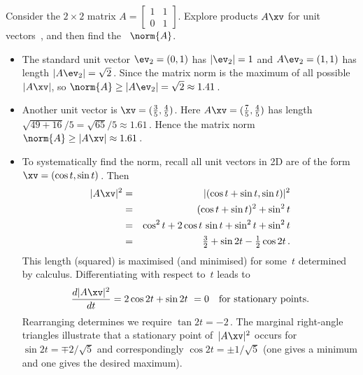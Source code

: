 \begin{example} \label{eg:}
Consider the \(2\times2\) matrix \(A=\begin{bmatrix} 1&1\\0&1 \end{bmatrix}\).
Explore products \(A\xv\) for unit vectors~\xv, and then find the ~\(\norm{A}\).
\begin{itemize}
\item The standard unit vector \(\ev_2=(0,1)\) has \(|\ev_2|=1\) and \(A\ev_2=(1,1)\) has length \(|A\ev_2|=\sqrt2\)\,.
Since the matrix norm is the maximum of all possible~\(|A\xv|\), so \(\norm{A}\geq|A\ev_2|=\sqrt2\approx 1.41\)\,.
\item Another unit vector is \(\xv=(\tfrac35,\tfrac45)\).
Here \(A\xv=(\tfrac75,\tfrac45)\) has length \(\sqrt{49+16}/5=\sqrt{65}/5\approx1.61\)\,.
Hence the matrix norm \(\norm{A}\geq|A\xv|\approx 1.61\)\,.
\item To systematically find the norm, recall all unit vectors in 2D are of the form \(\xv=(\cos t,\sin t)\)\,.
Then
\begin{eqnarray*}
|A\xv|^2&=&|(\cos t+\sin t,\sin t)|^2
\\&=&(\cos t+\sin t)^2+\sin^2 t
\\&=&\cos^2 t+2\cos t\,\sin t+\sin^2t+\sin^2 t
\\&=&\tfrac32+\sin 2t-\tfrac12\cos 2t\,.
\end{eqnarray*}
This length (squared) is maximised (and minimised) for some~\(t\) determined by calculus.
Differentiating with respect to~\(t\)  leads to
\begin{equation*}
\frac{d|A\xv|^2}{dt}=2\cos2t+\sin 2t \ =0\quad\text{for stationary points.}
\end{equation*}
Rearranging determines we require \(\tan 2t=-2\)\,.
The marginal right-angle triangles illustrate that a stationary point of~\(|A\xv|^2\) occurs for \(\sin 2t=\mp2/\sqrt5\) and correspondingly \(\cos2t=\pm1/\sqrt5\) (one gives a minimum and one gives the desired maximum).

\end{itemize}
\end{example}
